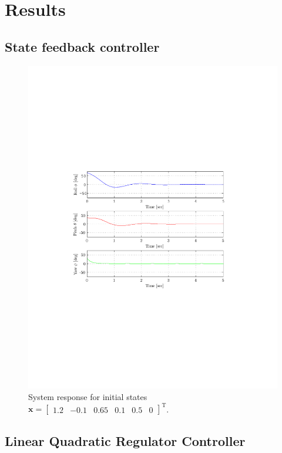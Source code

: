 \documentclass[12pt]{article}
\begin{document}
\section{Results}

\subsection{State feedback controller}

\begin{figure}
  \centering
  \includegraphics{state-feedback.pdf}
  \caption{System response for initial states $\mathbf{x} = \begin{bmatrix} 1.2 & -0.1 & 0.65 & 0.1 & 0.5 & 0 \end{bmatrix}^\mathrm{T} $.}
  \label{fig:res-sf}
\end{figure}

\subsection{Linear Quadratic Regulator Controller}
\end{document}
